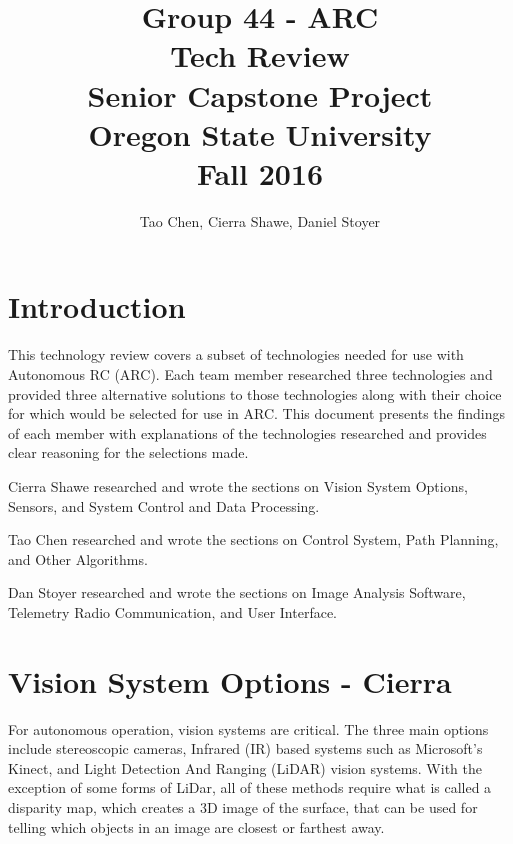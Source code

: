 \documentclass[compsoc,draftclsnofoot,onecolumn,10pt]{IEEEtran}
\begin{document}
\begin{titlepage}
\title{
Group 44 - ARC \\
Tech Review\\
\LARGE
Senior Capstone Project\\
Oregon State University\\
Fall 2016
}

\author{Tao Chen, Cierra Shawe, Daniel Stoyer}
\maketitle

\begin{abstract}

\end{abstract}

\thispagestyle{empty} %

\end{titlepage}
\newpage

\tableofcontents

\newpage

\section{Introduction}
This technology review covers a subset of technologies needed for use with
Autonomous RC (ARC). Each team member researched three technologies and provided
three alternative solutions to those technologies along with their choice for
which would be selected for use in ARC. This document presents the
findings of each member with explanations of the technologies researched and
provides clear reasoning for the selections made.\par
Cierra Shawe researched and wrote the sections on Vision System Options,
Sensors, and System Control and Data Processing.\par
Tao Chen researched and wrote the sections on Control System, Path Planning, and
Other Algorithms.\par
Dan Stoyer researched and wrote the sections on Image Analysis Software,
Telemetry Radio Communication, and User Interface.\par


\section{Vision System Options - Cierra} %
For autonomous operation, vision systems are critical. 
The three main options include stereoscopic cameras, Infrared (IR) based systems such as Microsoft's Kinect, and Light Detection And Ranging (LiDAR) vision systems. 
With the exception of some forms of LiDar, all of these methods require what is called a disparity map, which creates a 3D image of the surface, that can be used for telling which objects in an image are closest or farthest away. 
\end{document}
